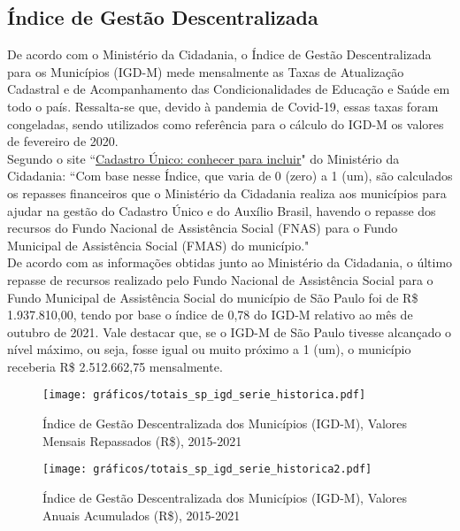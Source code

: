 \documentclass[14pt]{extarticle}
\begin{document}

\subsection{Índice de Gestão Descentralizada}
\label{indice_gestao_desc}

De acordo com o Ministério da Cidadania, o Índice de Gestão Descentralizada para os Municípios (IGD-M) mede mensalmente as Taxas de Atualização Cadastral e de Acompanhamento das Condicionalidades de Educação e Saúde em todo o país. Ressalta-se que, devido à pandemia de Covid-19, essas taxas foram congeladas, sendo utilizados como referência para o cálculo do IGD-M os valores de fevereiro de 2020.\\

Segundo o site ``\href{https://aplicacoes.cidadania.gov.br/ri/pabcad/}{Cadastro Único: conhecer para incluir}" do Ministério da Cidadania: ``Com base nesse Índice, que varia de 0 (zero) a 1 (um), são calculados os repasses financeiros que o Ministério da Cidadania realiza aos municípios para ajudar na gestão do Cadastro Único e do Auxílio Brasil, havendo o repasse dos recursos do Fundo Nacional de Assistência Social (FNAS) para o Fundo Municipal de Assistência Social (FMAS) do município."\\

De acordo com as informações obtidas junto ao Ministério da Cidadania, o último repasse de recursos realizado pelo Fundo Nacional de Assistência Social para o Fundo Municipal de Assistência Social do município de São Paulo foi de R\$ 1.937.810,00, tendo por base o índice de 0,78 do IGD-M relativo ao mês de outubro de 2021. Vale destacar que, se o IGD-M de São Paulo tivesse alcançado o nível máximo, ou seja, fosse igual ou muito próximo a 1 (um), o município receberia R\$ 2.512.662,75 mensalmente.\\

\begin{figure}[H]
\centering
	\caption{Índice de Gestão Descentralizada dos Municípios (IGD-M), Valores Mensais Repassados (R\$), 2015-2021}
	\texttt{[image: gráficos/totais\_sp\_igd\_serie\_historica.pdf]}
	\label{fig:pop_rua_igd_anual1}
\end{figure}

\begin{figure}[H]
\centering
	\caption{Índice de Gestão Descentralizada dos Municípios (IGD-M), Valores Anuais Acumulados (R\$), 2015-2021}
	\texttt{[image: gráficos/totais\_sp\_igd\_serie\_historica2.pdf]}
	\label{fig:pop_rua_igd_anual2}
\end{figure}
\end{document}
